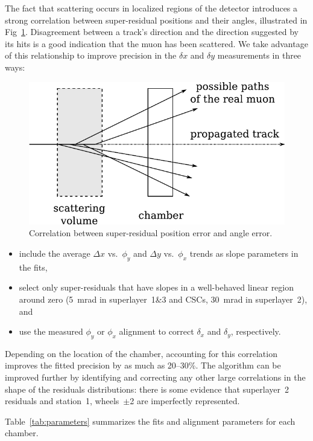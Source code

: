 \documentclass[12pt]{article}
\begin{document}
The fact that scattering occurs in localized regions of the detector
introduces a strong correlation between super-residual positions and
their angles, illustrated in Fig~\ref{fig:sawtooth_diagram}.
Disagreement between a track's direction and the direction suggested
by its hits is a good indication that the muon has been scattered.  We
take advantage of this relationship to improve precision in the
$\delta x$ and $\delta y$ measurements in three ways:
\begin{figure}
\begin{center} \includegraphics[height=4.5 cm]{sawtooth_diagram.pdf} \end{center}
\caption{Correlation between super-residual position error and angle error. \label{fig:sawtooth_diagram}}
\end{figure}
\begin{itemize}
\item include the average $\Delta x$ vs.~$\phi_y$ and $\Delta y$
  vs.~$\phi_x$ trends as slope parameters in the fits,
\item select only super-residuals that have slopes in a well-behaved
  linear region around zero (5~mrad in superlayer~1\&3 and CSCs,
  30~mrad in superlayer~2), and
\item use the measured $\phi_y$ or $\phi_x$ alignment to correct
  $\delta_x$ and $\delta_y$, respectively.
\end{itemize}
Depending on the location of the chamber, accounting for this
correlation improves the fitted precision by as much as 20--30\%.
The algorithm can be improved further by identifying and correcting
any other large correlations in the shape of the residuals
distributions: there is some evidence that superlayer~2 residuals and
station~1, wheels~$\pm$2 are imperfectly represented.

Table~\ref{tab:parameters} summarizes the fits and alignment
parameters for each chamber.
\end{document}
